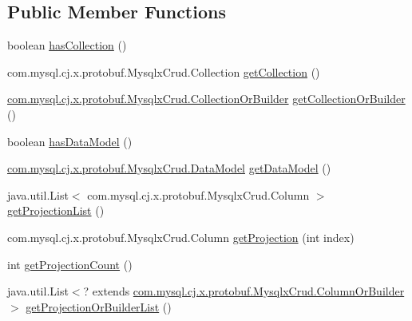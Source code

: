 \subsection*{Public Member Functions}
\begin{DoxyCompactItemize}
\item 
boolean \mbox{\hyperlink{interfacecom_1_1mysql_1_1cj_1_1x_1_1protobuf_1_1_mysqlx_crud_1_1_insert_or_builder_a336615f8c350a0cf986123098e41ff6b}{has\+Collection}} ()
\item 
com.\+mysql.\+cj.\+x.\+protobuf.\+Mysqlx\+Crud.\+Collection \mbox{\hyperlink{interfacecom_1_1mysql_1_1cj_1_1x_1_1protobuf_1_1_mysqlx_crud_1_1_insert_or_builder_a643f0a7d5a95f10b3398a2d747e235e3}{get\+Collection}} ()
\item 
\mbox{\hyperlink{interfacecom_1_1mysql_1_1cj_1_1x_1_1protobuf_1_1_mysqlx_crud_1_1_collection_or_builder}{com.\+mysql.\+cj.\+x.\+protobuf.\+Mysqlx\+Crud.\+Collection\+Or\+Builder}} \mbox{\hyperlink{interfacecom_1_1mysql_1_1cj_1_1x_1_1protobuf_1_1_mysqlx_crud_1_1_insert_or_builder_a87b21204d7b6924dd3168115d0ee56e1}{get\+Collection\+Or\+Builder}} ()
\item 
boolean \mbox{\hyperlink{interfacecom_1_1mysql_1_1cj_1_1x_1_1protobuf_1_1_mysqlx_crud_1_1_insert_or_builder_a46c764ddb65de5d35b03db00d6a8e1bd}{has\+Data\+Model}} ()
\item 
\mbox{\hyperlink{enumcom_1_1mysql_1_1cj_1_1x_1_1protobuf_1_1_mysqlx_crud_1_1_data_model}{com.\+mysql.\+cj.\+x.\+protobuf.\+Mysqlx\+Crud.\+Data\+Model}} \mbox{\hyperlink{interfacecom_1_1mysql_1_1cj_1_1x_1_1protobuf_1_1_mysqlx_crud_1_1_insert_or_builder_a4f74a11833a5ba6e6cbba4864f5f787f}{get\+Data\+Model}} ()
\item 
java.\+util.\+List$<$ com.\+mysql.\+cj.\+x.\+protobuf.\+Mysqlx\+Crud.\+Column $>$ \mbox{\hyperlink{interfacecom_1_1mysql_1_1cj_1_1x_1_1protobuf_1_1_mysqlx_crud_1_1_insert_or_builder_a89b023fe6e0fb43fbdc5ea79f4edbb5e}{get\+Projection\+List}} ()
\item 
com.\+mysql.\+cj.\+x.\+protobuf.\+Mysqlx\+Crud.\+Column \mbox{\hyperlink{interfacecom_1_1mysql_1_1cj_1_1x_1_1protobuf_1_1_mysqlx_crud_1_1_insert_or_builder_adc6edc053ae82269143364d7cc41e09c}{get\+Projection}} (int index)
\item 
int \mbox{\hyperlink{interfacecom_1_1mysql_1_1cj_1_1x_1_1protobuf_1_1_mysqlx_crud_1_1_insert_or_builder_a8b4c3ff0dafa0b68f5b6c17298362014}{get\+Projection\+Count}} ()
\item 
java.\+util.\+List$<$? extends \mbox{\hyperlink{interfacecom_1_1mysql_1_1cj_1_1x_1_1protobuf_1_1_mysqlx_crud_1_1_column_or_builder}{com.\+mysql.\+cj.\+x.\+protobuf.\+Mysqlx\+Crud.\+Column\+Or\+Builder}} $>$ \mbox{\hyperlink{interfacecom_1_1mysql_1_1cj_1_1x_1_1protobuf_1_1_mysqlx_crud_1_1_insert_or_builder_aab6f87baa793a13d67975b1ea980d582}{get\+Projection\+Or\+Builder\+List}} ()

\end{DoxyCompactItemize}
